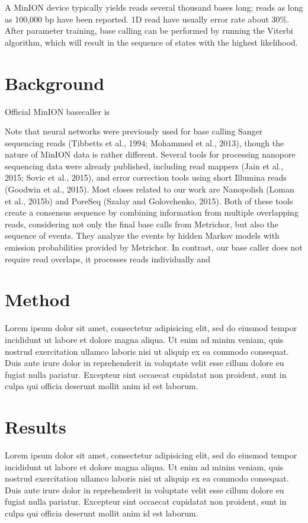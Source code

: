 \documentclass[times, utf8, seminar]{fer}
\begin{document}
A MinION device typically yields reads several thousand bases long; reads as long as 100,000 bp have been reported. 1D read have usually error rate about   30\%. After parameter training, base calling can be performed by running the Viterbi algorithm, which will result in the sequence of states with the highest likelihood.

\chapter{Background}

Official MinION basecaller is

Note that neural networks were previously used for base calling Sanger sequencing reads (Tibbetts et al., 1994; Mohammed et al., 2013), though the nature of MinION data is rather different. Several tools for processing nanopore sequencing data were already published, including read mappers (Jain et al., 2015; Sovic et al., 2015), and error correction tools using short Illumina reads (Goodwin et al., 2015). Most closes related to our work are Nanopolish (Loman et al., 2015b) and PoreSeq (Szalay and Golovchenko, 2015). Both of these tools create a consensus sequence by combining information from multiple overlapping reads, considering not only the final base calls from Metrichor, but also the sequence of events. They analyze the events by hidden Markov models with emission probabilities provided by Metrichor. In contrast, our base caller does not require read overlaps, it processes reads individually and

\chapter{Method}

Lorem ipsum dolor sit amet, consectetur adipisicing elit, sed do eiusmod tempor incididunt ut labore et dolore magna aliqua. Ut enim ad minim veniam, quis nostrud exercitation ullamco laboris nisi ut aliquip ex ea commodo consequat. Duis aute irure dolor in reprehenderit in voluptate velit esse cillum dolore eu fugiat nulla pariatur. Excepteur sint occaecat cupidatat non proident, sunt in culpa qui officia deserunt mollit anim id est laborum.
\chapter{Results}

Lorem ipsum dolor sit amet, consectetur adipisicing elit, sed do eiusmod tempor incididunt ut labore et dolore magna aliqua. Ut enim ad minim veniam, quis nostrud exercitation ullamco laboris nisi ut aliquip ex ea commodo consequat. Duis aute irure dolor in reprehenderit in voluptate velit esse cillum dolore eu fugiat nulla pariatur. Excepteur sint occaecat cupidatat non proident, sunt in culpa qui officia deserunt mollit anim id est laborum.
\end{document}
